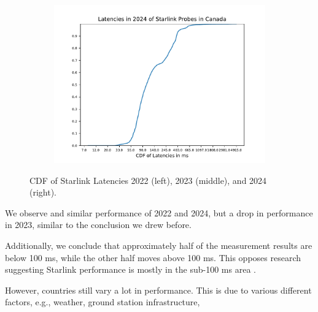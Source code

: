 \begin{figure}
\begin{subfigure}[b]{0.3\linewidth}
		\includegraphics[width=\linewidth]{chapters/4-results/latency/img/cdf_latencies_in_2024_of_starlink_probes_in_canada.pdf}
	\end{subfigure}
	\caption{CDF of Starlink Latencies 2022 (left), 2023 (middle), and 2024 (right).}
	\label{fig:latency-cdfs}
\end{figure}

We observe and similar performance of 2022 and 2024, but a drop in performance in 2023, similar to the conclusion we drew before.

Additionally, we conclude that approximately half of the measurement results are below 100 ms, while the other half moves above 100 ms. This opposes research suggesting Starlink performance is mostly in the sub-100 ms area \cite{DBLP:conf/www/MohanFCBRMO24, DBLP:conf/icnp/LaiLL20, DBLP:journals/pacmnet/RamanVCSZ23, DBLP:conf/imc/MichelTGB22}.


However, countries still vary a lot in performance. This is due to various different factors, e.g., weather, ground station infrastructure,

